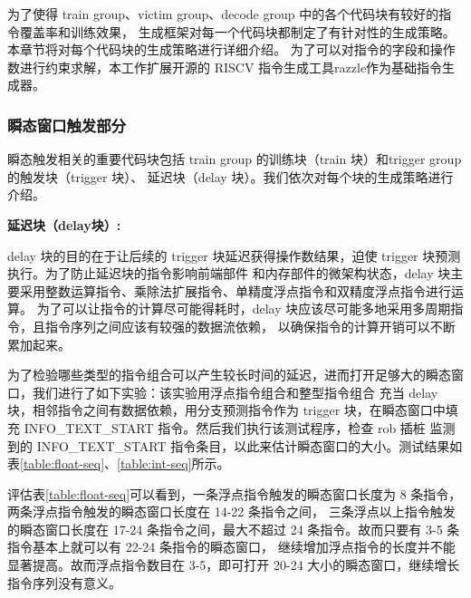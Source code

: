 为了使得 train group、victim group、decode group 中的各个代码块有较好的指令覆盖率和训练效果，
生成框架对每一个代码块都制定了有针对性的生成策略。本章节将对每个代码块的生成策略进行详细介绍。
为了可以对指令的字段和操作数进行约束求解，本工作扩展开源的 RISCV 指令生成工具razzle\cite{razzle}作为基础指令生成器。

\subsubsection{瞬态窗口触发部分}

瞬态触发相关的重要代码块包括 train group 的训练块（train 块）和trigger group 的触发块（trigger 块）、
延迟块（delay 块）。我们依次对每个块的生成策略进行介绍。\par

\textbf{延迟块（delay块）:}\par
delay 块的目的在于让后续的 trigger 块延迟获得操作数结果，迫使 trigger 块预测执行。为了防止延迟块的指令影响前端部件
和内存部件的微架构状态，delay 块主要采用整数运算指令、乘除法扩展指令、单精度浮点指令和双精度浮点指令进行运算。
为了可以让指令的计算尽可能得耗时，delay 块应该尽可能多地采用多周期指令，且指令序列之间应该有较强的数据流依赖，
以确保指令的计算开销可以不断累加起来。\par

为了检验哪些类型的指令组合可以产生较长时间的延迟，进而打开足够大的瞬态窗口，我们进行了如下实验：该实验用浮点指令组合和整型指令组合
充当 delay 块，相邻指令之间有数据依赖，用分支预测指令作为 trigger 块，在瞬态窗口中填充 INFO\_TEXT\_START 指令。然后我们执行该测试程序，检查 rob 插桩
监测到的 INFO\_TEXT\_START 指令条目，以此来估计瞬态窗口的大小。测试结果如表\ref{table:float-seq}、\ref{table:int-seq}所示。\par

评估表\ref{table:float-seq}可以看到，一条浮点指令触发的瞬态窗口长度为 8 条指令，两条浮点指令触发的瞬态窗口长度在 14-22 条指令之间，
三条浮点以上指令触发的瞬态窗口长度在 17-24 条指令之间，最大不超过 24 条指令。故而只要有 3-5 条指令基本上就可以有 22-24 条指令的瞬态窗口，
继续增加浮点指令的长度并不能显著提高。故而浮点指令数目在 3-5，即可打开 20-24 大小的瞬态窗口，继续增长指令序列没有意义。\par

